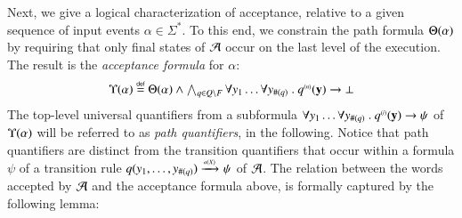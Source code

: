 Next, we give a logical characterization of acceptance, relative to a
given sequence of input events $\alpha \in \Sigma^*$. To this end, we
constrain the path formula $\Theta({\alpha})$ by requiring that only
final states of $\mathcal{A}$ occur on the last level of the execution.  The
result is the \emph{acceptance formula} for $\alpha$:
\begin{equation}\label{eq:accform}
\begin{array}{c}
\Upsilon({\alpha}) \stackrel{\scriptscriptstyle{\mathsf{def}}}{=} \Theta({\alpha}) \wedge \bigwedge_{q
  \in Q \setminus F} \forall y_1 \ldots \forall y_{\#(q)} ~.~
{q}^{\scriptscriptstyle{({n})}}(\mathbf y) \rightarrow \bot
\end{array}
\end{equation}
The top-level universal quantifiers from a subformula $\forall y_1
\ldots \forall y_{\#(q)} ~.~ {q}^{\scriptscriptstyle{({i})}}(\mathbf y) \rightarrow \psi$
of $\Upsilon({\alpha})$ will be referred to as \emph{path quantifiers},
in the following. Notice that path quantifiers are distinct from the
transition quantifiers that occur within a formula $\psi$ of a
transition rule $q(y_1,\ldots,y_{\#(q)}) \xrightarrow{{\scriptscriptstyle a(X)}}_{{\scriptstyle }} \psi$ of $\mathcal{A}$.
The relation between the words accepted by $\mathcal{A}$ and the acceptance
formula above, is formally captured by the following lemma:

